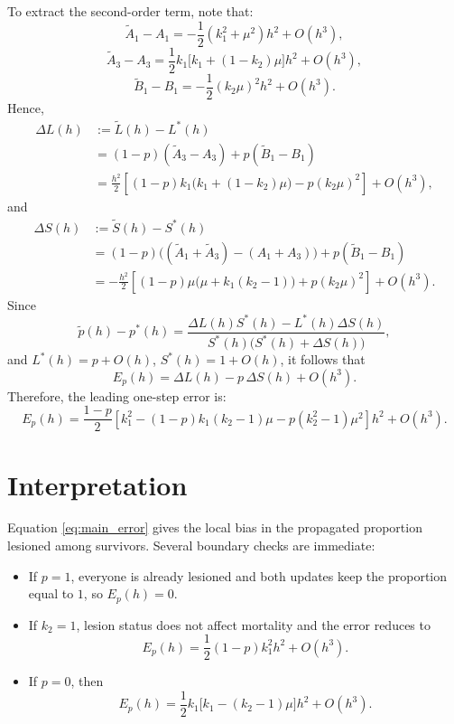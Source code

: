 \documentclass{article}
\begin{document}
To extract the second-order term, note that:
\[
\widetilde A_1-A_1
= -\frac{1}{2}(k_1^2+\mu^2)h^2 + O(h^3),
\]
\[
\widetilde A_3-A_3
= \frac{1}{2}k_1\bigl[k_1+(1-k_2)\mu\bigr]h^2 + O(h^3),
\]
\[
\widetilde B_1-B_1
= -\frac{1}{2}(k_2\mu)^2 h^2 + O(h^3).
\]
Hence,
\begin{align*}
\Delta L(h)
&:= \widetilde L(h)-L^\ast(h) \\
&= (1-p)(\widetilde A_3-A_3)+p(\widetilde B_1-B_1) \\
&= \frac{h^2}{2}
\left[
(1-p)k_1\bigl(k_1+(1-k_2)\mu\bigr)-p(k_2\mu)^2
\right]
+ O(h^3),
\end{align*}
and
\begin{align*}
\Delta S(h)
&:= \widetilde S(h)-S^\ast(h) \\
&= (1-p)\bigl((\widetilde A_1+\widetilde A_3)-(A_1+A_3)\bigr)
   + p(\widetilde B_1-B_1) \\
&= -\frac{h^2}{2}
\left[
(1-p)\mu\bigl(\mu+k_1(k_2-1)\bigr)+p(k_2\mu)^2
\right]
+ O(h^3).
\end{align*}
Since
\[
\widetilde p(h)-p^\ast(h)
=
\frac{\Delta L(h)S^\ast(h)-L^\ast(h)\Delta S(h)}
{S^\ast(h)\bigl(S^\ast(h)+\Delta S(h)\bigr)},
\]
and \(L^\ast(h)=p+O(h)\), \(S^\ast(h)=1+O(h)\), it follows that
\[
E_p(h)=\Delta L(h)-p\,\Delta S(h)+O(h^3).
\]
Therefore, the leading one-step error is:
\begin{equation}
\label{eq:main_error}
E_p(h)
=
\frac{1-p}{2}
\left[
k_1^2-(1-p)k_1(k_2-1)\mu-p(k_2^2-1)\mu^2
\right]h^2
+ O(h^3).
\end{equation}

\section*{Interpretation}

Equation \eqref{eq:main_error} gives the local bias in the propagated proportion lesioned among survivors. Several boundary checks are immediate:
\begin{itemize}
\item If \(p=1\), everyone is already lesioned and both updates keep the proportion equal to \(1\), so \(E_p(h)=0\).
\item If \(k_2=1\), lesion status does not affect mortality and the error reduces to
      \[
      E_p(h)=\frac{1}{2}(1-p)k_1^2 h^2 + O(h^3).
      \]
\item If \(p=0\), then
      \[
      E_p(h)=\frac{1}{2}k_1\bigl[k_1-(k_2-1)\mu\bigr]h^2 + O(h^3).
      \]
\end{itemize}
\end{document}
